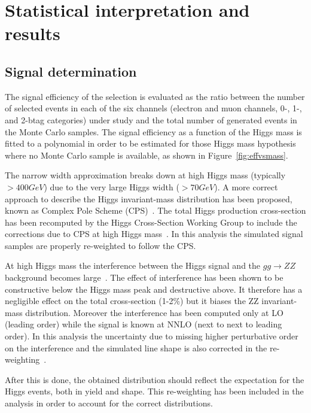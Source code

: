 

\chapter{Statistical interpretation and results}
\label{sec:results}

\section{Signal determination}
The signal efficiency of the selection is evaluated as the ratio between the number of selected events in each of the six channels (electron and muon channels, 0-, 1-, and 2-btag categories) under study and the total number of generated events in the Monte Carlo samples.  The signal efficiency as a function of the Higgs mass is fitted to a polynomial in order to be estimated for those Higgs mass hypothesis where no Monte Carlo sample is available, 
as shown in Figure~\ref{fig:effvsmass}.

The narrow width approximation breaks down at high Higgs mass (typically $>400 GeV$) due to the very large Higgs width ($>70 GeV$). 
A more correct approach to describe the Higgs invariant-mass distribution has been proposed, known as Complex Pole Scheme (CPS)~\cite{Goria:2011wa}.
The total Higgs production cross-section has been recomputed by the Higgs Cross-Section Working Group to include the corrections due to CPS at high Higgs mass~\cite{LHC-HCS}.  In this analysis the simulated signal samples are properly re-weighted to follow the CPS.

At high Higgs mass the interference between the Higgs signal and the $gg\rightarrow ZZ$ background becomes large~\cite{Passarino:2012ri}.  The effect of interference has been shown to be constructive below the Higgs mass peak and destructive above. It therefore has a negligible effect on the total cross-section (1-2\%) but it biases the ZZ invariant-mass distribution. Moreover the interference has been computed only at LO (leading order) while the signal is known at NNLO (next to next to leading order). In this analysis the uncertainty due to missing higher perturbative order on the interference and the simulated line shape is also corrected in the re-weighting~\cite{Passarino:2012ri}.

After this is done, the obtained distribution should reflect the expectation for the Higgs events, both in yield and shape. This re-weighting has been included in the analysis in order to account for the correct distributions.

